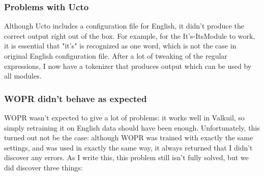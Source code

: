 \documentclass[12pt]{article}
\begin{document}
\subsubsection{Problems with Ucto}
Although Ucto includes a configuration file for English, it didn't produce the correct output right out of the box. For example, for the It's-ItsModule to work, it is essential that "it's" is recognized as one word, which is not the case in original English configuration file. After a lot of tweaking of the regular expressions, I now have a tokenizer that produces output which can be used by all modules.


\subsubsection{WOPR didn't behave as expected}
WOPR wasn't expected to give a lot of problems: it works well in Valkuil, so simply retraining it on English data should have been enough. Unfortunately, this turned out not be the case: although WOPR was trained with exactly the same settings, and was used in exactly the same way, it always returned that I didn't discover any errors. As I write this, this problem still isn't fully solved, but we did discover three things: 
\end{document}
